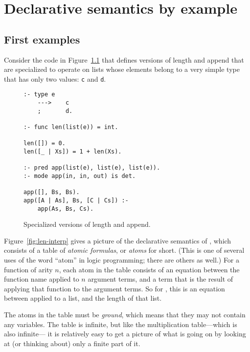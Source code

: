 \chapter{Declarative semantics by example}
\label{sec:by-example}

\section{First examples}
\label{sec:first-examples}

Consider the code in Figure~\ref{fig:len-app}
that defines versions of length and append
that are specialized to operate on lists
whose elements belong to a very simple type
that has only two values: \verb#c# and \verb#d#.

\begin{figure}[htb]
\begin{verbatim}
:- type e
    --->    c
    ;       d.

:- func len(list(e)) = int.

len([]) = 0.
len([_ | Xs]) = 1 + len(Xs).

:- pred app(list(e), list(e), list(e)).
:- mode app(in, in, out) is det.

app([], Bs, Bs).
app([A | As], Bs, [C | Cs]) :-
    app(As, Bs, Cs).
\end{verbatim}
\caption{Specialized versions of length and append.\label{fig:len-app}}
\end{figure}

Figure~\ref{fig:len-interp} gives a picture
of the declarative semantics of ,
which consists of a table of \emph{atomic formulas},
or \emph{atoms\label{gi:atom}} for short.
(This is one of several uses of the word ``atom'' in logic programming;
there are others as well.)
For a function of arity $n$, each atom in the table
consists of an equation between
the function name applied to $n$ argument terms,
and a term that is the result of
applying that function to the argument terms.
So for ,
this is an equation between  applied to a list,
and the length of that list.


The atoms in the table must be \emph{ground},
which means that they may not contain any variables.
The table is infinite,
but like the multiplication table---which is also infinite---%
it is relatively easy to get a picture of what is going on
by looking at (or thinking about) only a finite part of it.

